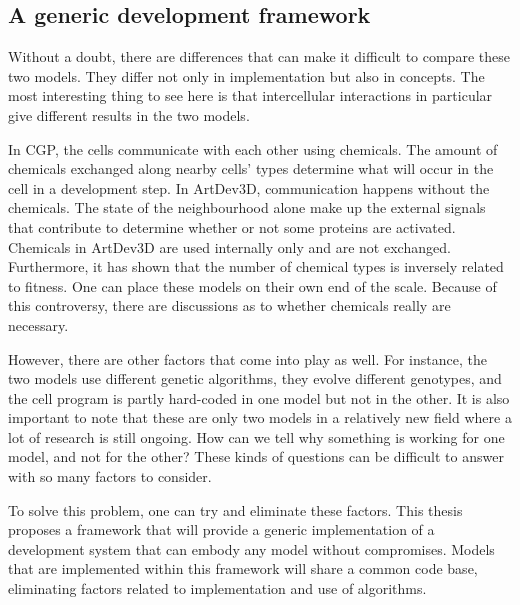 \subsection{A generic development framework}
Without a doubt, there are differences that can make it difficult to compare these two models. They differ not only in implementation but also in concepts. The most interesting thing to see here is that intercellular interactions in particular give different results in the two models.

In CGP, the cells communicate with each other using chemicals. The amount of chemicals exchanged along nearby cells' types determine what will occur in the cell in a development step. In ArtDev3D, communication happens without the chemicals. The state of the neighbourhood alone make up the external signals that contribute to determine whether or not some proteins are activated. Chemicals in ArtDev3D are used internally only and are not exchanged. Furthermore, it has shown that the number of chemical types is inversely related to fitness. One can place these models on their own end of the scale. Because of this controversy, there are discussions as to whether chemicals really are necessary.

However, there are other factors that come into play as well. For instance, the two models use different genetic algorithms, they evolve different genotypes, and the cell program is partly hard-coded in one model but not in the other. It is also important to note that these are only two models in a relatively new field where a lot of research is still ongoing. How can we tell why something is working for one model, and not for the other? These kinds of questions can be difficult to answer with so many factors to consider.

To solve this problem, one can try and eliminate these factors. This thesis proposes a framework that will provide a generic implementation of a development system that can embody any model without compromises. Models that are implemented within this framework will share a common code base, eliminating factors related to implementation and use of algorithms.

